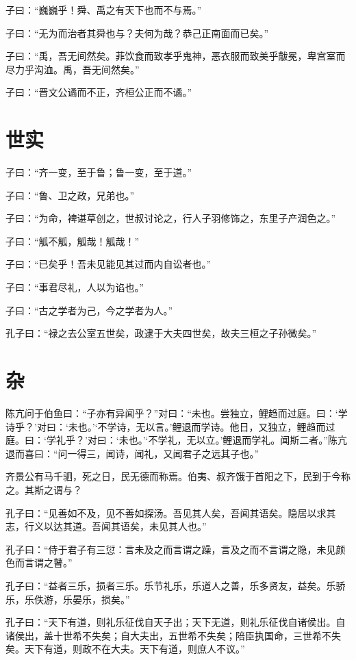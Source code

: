 \documentclass[a5paper]{ctexbook}
\begin{document}
    子曰：“巍巍乎！舜、禹之有天下也而不与焉。”

    子曰：“无为而治者其舜也与？夫何为哉？恭己正南面而已矣。”

    子曰：“禹，吾无间然矣。菲饮食而致孝乎鬼神，恶衣服而致美乎黻冕，卑宫室而尽力乎沟洫。禹，吾无间然矣。”

    子曰：“晋文公谲而不正，齐桓公正而不谲。”

    \chapter{世实}

    子曰：“齐一变，至于鲁；鲁一变，至于道。”

    子曰：“鲁、卫之政，兄弟也。”

    子曰：“为命，裨谌草创之，世叔讨论之，行人子羽修饰之，东里子产润色之。”

    子曰：“觚不觚，觚哉！觚哉！”

    子曰：“已矣乎！吾未见能见其过而内自讼者也。”

    子曰：“事君尽礼，人以为谄也。”

    子曰：“古之学者为己，今之学者为人。”

    孔子曰：“禄之去公室五世矣，政逮于大夫四世矣，故夫三桓之子孙微矣。”

    \chapter{杂}

    陈亢问于伯鱼曰：“子亦有异闻乎？”对曰：“未也。尝独立，鲤趋而过庭。曰：‘学诗乎？’对曰：‘未也。’‘不学诗，无以言。’鲤退而学诗。他日，又独立，鲤趋而过庭。曰：‘学礼乎？’对曰：‘未也。’‘不学礼，无以立。’鲤退而学礼。闻斯二者。”陈亢退而喜曰：“问一得三，闻诗，闻礼，又闻君子之远其子也。”

    齐景公有马千驷，死之日，民无德而称焉。伯夷、叔齐饿于首阳之下，民到于今称之。其斯之谓与？

    孔子曰：“见善如不及，见不善如探汤。吾见其人矣，吾闻其语矣。隐居以求其志，行义以达其道。吾闻其语矣，未见其人也。”

    孔子曰：“侍于君子有三愆：言未及之而言谓之躁，言及之而不言谓之隐，未见颜色而言谓之瞽。”

    孔子曰：“益者三乐，损者三乐。乐节礼乐，乐道人之善，乐多贤友，益矣。乐骄乐，乐佚游，乐晏乐，损矣。”

    孔子曰：“天下有道，则礼乐征伐自天子出；天下无道，则礼乐征伐自诸侯出。自诸侯出，盖十世希不失矣；自大夫出，五世希不失矣；陪臣执国命，三世希不失矣。天下有道，则政不在大夫。天下有道，则庶人不议。”
\end{document}
